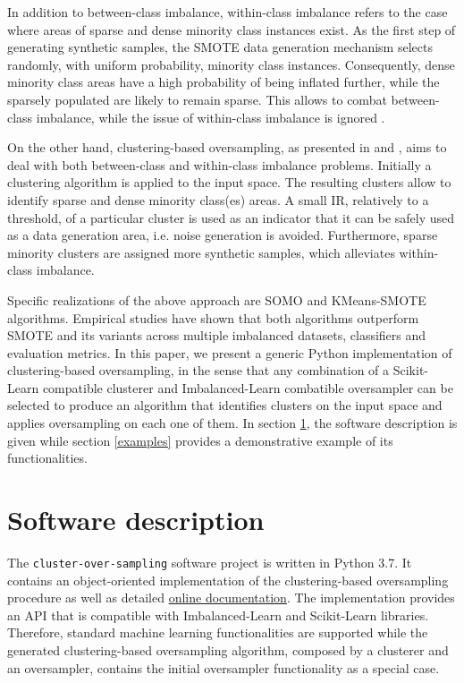 \documentclass[preprint,12pt, a4paper]{elsarticle}
\begin{document}
In addition to between-class imbalance, within-class imbalance refers to the case where areas of sparse and dense minority class instances exist. As the first step of generating synthetic samples, the SMOTE data generation mechanism selects randomly, with uniform probability, minority class instances. Consequently, dense minority class areas have a high probability of being inflated further, while the sparsely populated are likely to remain sparse. This allows to combat between-class imbalance, while the issue of within-class imbalance is ignored \cite{Prati2004}.

On the other hand, clustering-based oversampling, as presented in \cite{Douzas2017a} and \cite{Douzas2018}, aims to deal with both between-class and within-class imbalance problems. Initially a clustering algorithm is applied to the input space. The resulting clusters allow to identify sparse and dense minority class(es) areas. A small IR, relatively to a threshold, of a particular cluster is used as an indicator that it can be safely used as a data generation area, i.e. noise generation is avoided. Furthermore, sparse minority clusters are assigned more synthetic samples, which alleviates within-class imbalance.

Specific realizations of the above approach are SOMO \cite{Douzas2017a} and KMeans-SMOTE \cite{Douzas2018} algorithms. Empirical studies have shown that both algorithms outperform SMOTE and its variants across multiple imbalanced datasets, classifiers and evaluation metrics. In this paper, we present a generic Python implementation of clustering-based oversampling, in the sense that any combination of a Scikit-Learn compatible clusterer and Imbalanced-Learn combatible oversampler can be selected to produce an algorithm that identifies clusters on the input space and applies oversampling on each one of them.  In section \ref{software-description}, the software description is given while section \ref{examples} provides a demonstrative example of its functionalities.

\section{Software description}
\label{software-description}

The \texttt{cluster-over-sampling} software project is written in Python 3.7. It contains an object-oriented implementation of the clustering-based oversampling procedure as well as detailed \href{https://cluster-over-sampling.readthedocs.io/}{online documentation}. The implementation provides an API that is compatible with Imbalanced-Learn and Scikit-Learn libraries. Therefore, standard machine learning functionalities are supported while the generated clustering-based oversampling algorithm, composed by a clusterer and an oversampler, contains the initial oversampler functionality as a special case.
\end{document}
